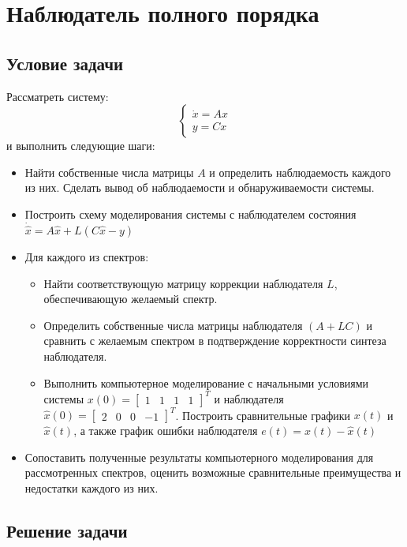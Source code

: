 \chapter{Наблюдатель полного порядка}
\label{ch:chap2}
\section{Условие задачи}

Рассматреть систему:
$$
  \begin{cases}
    \dot{x} = Ax \\
    y = Cx
  \end{cases}
$$ и выполнить следующие шаги:

\begin{itemize}
    \item  Найти собственные числа матрицы $A$ и определить наблюдаемость каждого из них. 
    Сделать вывод об наблюдаемости и обнаруживаемости системы.
    \item  Построить схему моделирования системы с наблюдателем состояния $\dot{\hat{x}} = A\hat{x} + L(C\hat{x}-y  )$
    \item Для каждого из спектров:
    \begin{itemize}
        \item  Найти соответствующую матрицу коррекции наблюдателя $L$, обеспечивающую желаемый спектр.
        \item Определить собственные числа матрицы наблюдателя $(A+LC)$ и сравнить
        с желаемым спектром в подтверждение корректности синтеза наблюдателя.
        \item Выполнить компьютерное моделирование с начальными условиями системы 
        $x(0) = \begin{bmatrix} 1&1&1&1 \end{bmatrix}^T$ и наблюдателя $\hat{x}(0)=\begin{bmatrix}2 & 0& 0 &-1\end{bmatrix}^T $.
        Построить  сравнительные графики $x(t)$ и $\hat{x}(t)$, а также график ошибки наблюдателя
         $e(t) = x(t) - \hat{x}(t)$
    \end{itemize}
    \item Сопоставить полученные результаты компьютерного моделирования для рассмотренных спектров, 
    оценить возможные сравнительные преимущества и недостатки каждого из них.
\end{itemize}
    

\section{Решение задачи}

